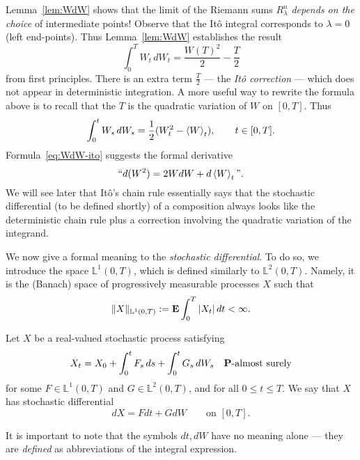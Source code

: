 Lemma~\ref{lem:WdW} shows that the limit of the Riemann sums $R_\lambda^n$ \emph{depends on the choice} of intermediate points! Observe that the It\^{o} integral corresponds to $\lambda=0$ (left end-points). Thus Lemma~\ref{lem:WdW} establishes the result
\begin{equation*}
    \int_0^T W_t \,dW_t = \frac{W(T)^2}{2}-\frac{T}{2}
\end{equation*}
from first principles. There is an extra term $\frac{T}{2}$ --- the \emph{It\^{o} correction} --- which does not appear in deterministic integration. A more useful way to rewrite the formula above is to recall that the $T$ is the quadratic variation of $W$ on $[0,T]$. Thus
\begin{equation}
\label{eq:WdW-ito}
    \int_0^t W_s\,dW_s = \frac{1}{2}(W_t^2 - \braket{W}_t), \qquad t\in [0,T].
\end{equation}
Formula~\eqref{eq:WdW-ito} suggests the formal derivative
\begin{equation*}
    \text{``}d(W^2) = 2WdW + d\braket{W}_t\text{''}.
\end{equation*}
We will see later that It\^{o}'s chain rule essentially says that the stochastic differential (to be defined shortly) of a composition always looks like the deterministic chain rule plus a correction involving the quadratic variation of the integrand.

We now give a formal meaning to the \emph{stochastic differential}. To do so, we introduce the space $\mathbb{L}^1(0,T)$, which is defined similarly to $\mathbb{L}^2(0,T)$. Namely, it is the (Banach) space of progressively measurable processes $X$ such that
\begin{equation*}
    \|X\|_{\mathbb{L}^1(0,T)} := \mathbf{E}\int_0^T |X_t|\,dt<\infty.
\end{equation*}

\begin{definition}
    Let $X$ be a real-valued stochastic process satisfying
    \begin{equation*}
        X_t = X_0 + \int_0^t F_s\,ds + \int_0^t G_s\,dW_s \quad\text{$\mathbf{P}$-almost surely}
    \end{equation*}
    for some $F\in\mathbb{L}^1(0,T)$ and $G\in\mathbb{L}^2(0,T)$, and for all $0\le t\le T$. We say that $X$ has stochastic differential
    \begin{equation}
        dX = Fdt + GdW \qquad\text{on }[0,T].
    \end{equation}
\end{definition}
It is important to note that the symbols $dt, dW$ have no meaning alone --- they are \emph{defined} as abbreviations of the integral expression.

